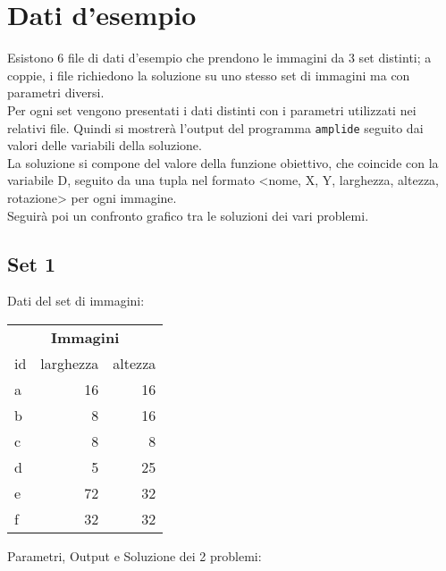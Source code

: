 
\section{Dati d'esempio}

	Esistono 6 file di dati d'esempio che prendono le immagini da 3 set distinti; a coppie, i file richiedono la soluzione su uno stesso set di immagini ma con parametri diversi. \\
	Per ogni set vengono presentati i dati distinti con i parametri utilizzati nei relativi file. Quindi si mostrerà l'output del programma \texttt{amplide} seguito dai valori delle variabili della soluzione. \\
	La soluzione si compone del valore della funzione obiettivo, che coincide con la variabile D, seguito da una tupla nel formato <nome, X, Y, larghezza, altezza, rotazione> per ogni immagine. \\
	Seguirà poi un confronto grafico tra le soluzioni dei vari problemi. %



	\subsection{Set 1}
Dati del set di immagini: 

\begin{table}[H]
\centering
\footnotesize
\begin{tabular}{l|r|r}
\multicolumn{3}{c}{\textbf{Immagini}} \\ 
id & larghezza & altezza \\
\hline
a & 16 & 16 \\
b & 8&16\\
c & 8& 8\\
d & 5&25\\
e & 72&32\\
f & 32 &32\\
\end{tabular}
\end{table}


\noindent Parametri, Output e Soluzione dei 2 problemi: 

